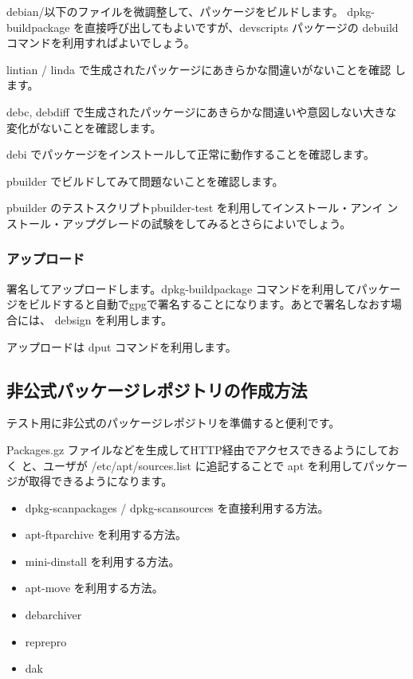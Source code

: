 \documentclass[mingoth,a4paper]{jsarticle}
\begin{document}
debian/以下のファイルを微調整して、パッケージをビルドします。
dpkg-buildpackage を直接呼び出してもよいですが、devscripts パッケージの
debuildコマンドを利用すればよいでしょう。

lintian / linda で生成されたパッケージにあきらかな間違いがないことを確認
します。

debc, debdiff で生成されたパッケージにあきらかな間違いや意図しない大きな
変化がないことを確認します。

debi でパッケージをインストールして正常に動作することを確認します。

pbuilder でビルドしてみて問題ないことを確認します。

pbuilder のテストスクリプトpbuilder-test を利用してインストール・アンイ
ンストール・アップグレードの試験をしてみるとさらによいでしょう。

 \subsubsection{アップロード}

署名してアップロードします。dpkg-buildpackage コマンドを利用してパッケー
ジをビルドすると自動でgpgで署名することになります。あとで署名しなおす場
合には、 debsign を利用します。

アップロードは dput コマンドを利用します。

 \subsection{非公式パッケージレポジトリの作成方法}

 テスト用に非公式のパッケージレポジトリを準備すると便利です。

 Packages.gz ファイルなどを生成してHTTP経由でアクセスできるようにしておく
 と、ユーザが /etc/apt/sources.list に追記することで apt を利用してパッケー
 ジが取得できるようになります。

 \begin{itemize}
  \item dpkg-scanpackages / dpkg-scansources を直接利用する方法。
  \item apt-ftparchive を利用する方法。
  \item mini-dinstall を利用する方法。
  \item apt-move を利用する方法。
  \item debarchiver
  \item reprepro
  \item dak
 \end{itemize}
\end{document}
